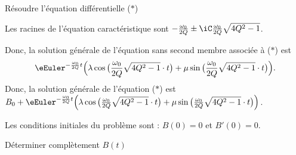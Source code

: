 


\begin{enonce}
Résoudre l'équation différentielle ($\ast$)
\end{enonce}



\begin{corrige}
Les racines de l'équation caractéristique sont $-\frac{\omega_0}{2Q} \pm \iC \frac{\omega_0}{2Q} \sqrt{4Q^2-1}$.

Donc, la solution générale de l'équation sans second membre associée à  ($\ast$) est
\[
\eEuler^{-\frac{\omega_0}{2Q} t}
\Big(
\lambda \cos \big( \frac{\omega_0}{2Q} \sqrt{4Q^2-1} \cdot t\big)
+
\mu \sin \big( \frac{\omega_0}{2Q} \sqrt{4Q^2-1} \cdot t\big)
\Big).
\]
Donc, la solution générale de l'équation ($\ast$) est
$B_0+\eEuler^{-\frac{\omega_0}{2Q} t}
\Big(
\lambda \cos \big( \frac{\omega_0}{2Q} \sqrt{4Q^2-1} \cdot t\big)
+
\mu \sin \big( \frac{\omega_0}{2Q} \sqrt{4Q^2-1} \cdot t\big)
\Big)$.
\end{corrige}



\pauseEntrainement

\medskip
Les conditions initiales du problème sont : $B(0)=0$ et $B'(0)=0$.

\repriseEntrainement





\begin{enonce}
Déterminer complètement $B(t)$
\end{enonce}

